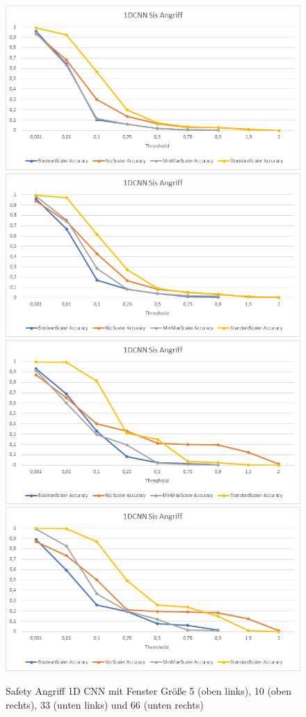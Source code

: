 \documentclass[12pt,a4paper]{scrartcl}
\numberwithin{equation}{section}
\begin{document}
\begin{figure}[ht!]
	\centering
	  \includegraphics[scale=0.5]{sis_1DCNN_5.png}
	  \includegraphics[scale=0.5]{sis_1DCNN_10.png}
	  \includegraphics[scale=0.5]{sis_1DCNN_33.png}
	  \includegraphics[scale=0.5]{sis_1DCNN_66.png}
	  \caption{Safety Angriff 1D CNN mit Fenster Größe 5 (oben links), 10 (oben rechts), 33 (unten links) und 66 (unten rechts)}
	\label{1DCNN_20}
\end{figure}
\end{document}
